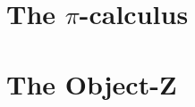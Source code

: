 

\section{The \texorpdfstring{$\pi$}{pi}-calculus}
\label{sec_pi_calculus}


\section{The Object-Z}
\label{sec_oz}



